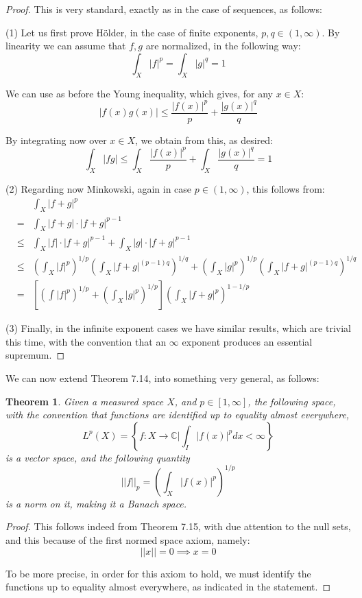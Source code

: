 \documentclass[12pt]{amsbook}
\newtheorem{theorem}{Theorem}[chapter]
\begin{document}
\begin{proof}
This is very standard, exactly as in the case of sequences, as follows:

\medskip

(1) Let us first prove H\"older, in the case of finite exponents, $p,q\in(1,\infty)$. By linearity we can assume that $f,g$ are normalized, in the following way:
$$\int_X|f|^p=\int_X|g|^q=1$$

We can use as before the Young inequality, which gives, for any $x\in X$:
$$|f(x)g(x)|\leq\frac{|f(x)|^p}{p}+\frac{|g(x)|^q}{q}$$

By integrating now over $x\in X$, we obtain from this, as desired:
$$\int_X|fg|
\leq\int_X\frac{|f(x)|^p}{p}+\int_X\frac{|g(x)|^q}{q}
=1$$

(2) Regarding now Minkowski, again in case $p\in(1,\infty)$, this follows from:
\begin{eqnarray*}
&&\int_X|f+g|^p\\
&=&\int_X|f+g|\cdot|f+g|^{p-1}\\
&\leq&\int_X|f|\cdot|f+g|^{p-1}+\int_X|g|\cdot|f+g|^{p-1}\\
&\leq&\left(\int_X|f|^p\right)^{1/p}\left(\int_X|f+g|^{(p-1)q}\right)^{1/q}
+\left(\int_X|g|^p\right)^{1/p}\left(\int_X|f+g|^{(p-1)q}\right)^{1/q}\\
&=&\left[\left(\int|f|^p\right)^{1/p}+\left(\int_X|g|^p\right)^{1/p}\right]\left(\int_X|f+g|^p\right)^{1-1/p}
\end{eqnarray*}

(3) Finally, in the infinite exponent cases we have similar results, which are trivial this time, with the convention that an $\infty$ exponent produces an essential supremum.
\end{proof}

We can now extend Theorem 7.14, into something very general, as follows:

\begin{theorem}
Given a measured space $X$, and $p\in[1,\infty]$, the following space, with the convention that functions are identified up to equality almost everywhere,
$$L^p(X)=\left\{f:X\to\mathbb C\Big|\int_I|f(x)|^pdx<\infty\right\}$$
is a vector space, and the following quantity
$$||f||_p=\left(\int_X|f(x)|^p\right)^{1/p}$$
is a norm on it, making it a Banach space.
\end{theorem}

\begin{proof}
This follows indeed from Theorem 7.15, with due attention to the null sets, and this because of the first normed space axiom, namely:
$$||x||=0\implies x=0$$

To be more precise, in order for this axiom to hold, we must identify the functions up to equality almost everywhere, as indicated in the statement.
\end{proof}
\end{document}
